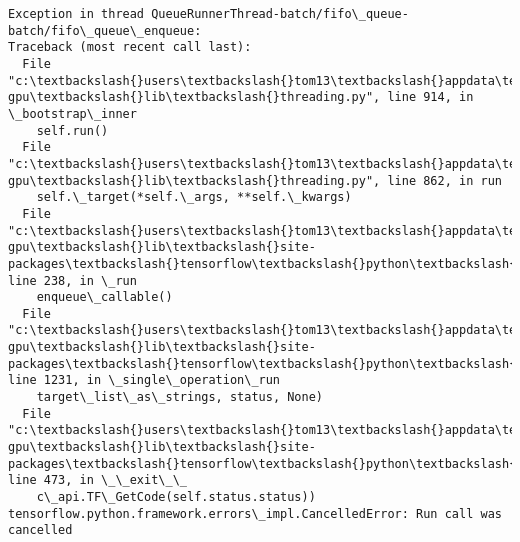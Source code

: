 \documentclass[11pt]{article}
\begin{document}
\begin{Verbatim}[commandchars=\\\{\}]
Exception in thread QueueRunnerThread-batch/fifo\_queue-batch/fifo\_queue\_enqueue:
Traceback (most recent call last):
  File "c:\textbackslash{}users\textbackslash{}tom13\textbackslash{}appdata\textbackslash{}local\textbackslash{}conda\textbackslash{}conda\textbackslash{}envs\textbackslash{}tensorflow-gpu\textbackslash{}lib\textbackslash{}threading.py", line 914, in \_bootstrap\_inner
    self.run()
  File "c:\textbackslash{}users\textbackslash{}tom13\textbackslash{}appdata\textbackslash{}local\textbackslash{}conda\textbackslash{}conda\textbackslash{}envs\textbackslash{}tensorflow-gpu\textbackslash{}lib\textbackslash{}threading.py", line 862, in run
    self.\_target(*self.\_args, **self.\_kwargs)
  File "c:\textbackslash{}users\textbackslash{}tom13\textbackslash{}appdata\textbackslash{}local\textbackslash{}conda\textbackslash{}conda\textbackslash{}envs\textbackslash{}tensorflow-gpu\textbackslash{}lib\textbackslash{}site-packages\textbackslash{}tensorflow\textbackslash{}python\textbackslash{}training\textbackslash{}queue\_runner\_impl.py", line 238, in \_run
    enqueue\_callable()
  File "c:\textbackslash{}users\textbackslash{}tom13\textbackslash{}appdata\textbackslash{}local\textbackslash{}conda\textbackslash{}conda\textbackslash{}envs\textbackslash{}tensorflow-gpu\textbackslash{}lib\textbackslash{}site-packages\textbackslash{}tensorflow\textbackslash{}python\textbackslash{}client\textbackslash{}session.py", line 1231, in \_single\_operation\_run
    target\_list\_as\_strings, status, None)
  File "c:\textbackslash{}users\textbackslash{}tom13\textbackslash{}appdata\textbackslash{}local\textbackslash{}conda\textbackslash{}conda\textbackslash{}envs\textbackslash{}tensorflow-gpu\textbackslash{}lib\textbackslash{}site-packages\textbackslash{}tensorflow\textbackslash{}python\textbackslash{}framework\textbackslash{}errors\_impl.py", line 473, in \_\_exit\_\_
    c\_api.TF\_GetCode(self.status.status))
tensorflow.python.framework.errors\_impl.CancelledError: Run call was cancelled


\end{Verbatim}
\end{document}
